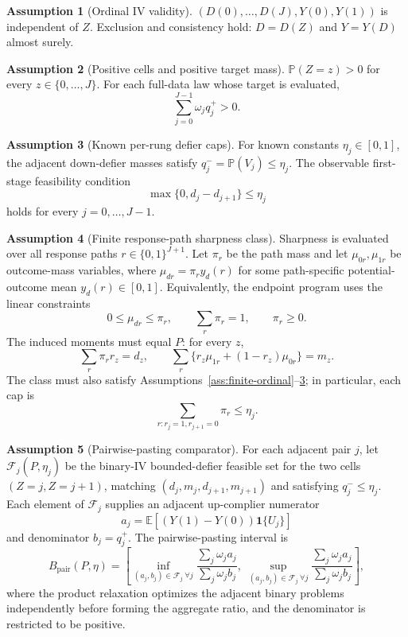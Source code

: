 \documentclass[11pt]{article}
\newcommand{\E}{\mathbb{E}}
\renewcommand{\Pr}{\mathbb{P}}
\newcommand{\one}{\mathbf{1}}
\theoremstyle{definition}
\newtheorem{assumption}{Assumption}
\theoremstyle{plain}
\theoremstyle{remark}
\begin{document}
\begin{assumption}[Ordinal IV validity]\label{ass:ord-iv}
\((D(0),\ldots,D(J),Y(0),Y(1))\) is independent of \(Z\).  Exclusion and
consistency hold: \(D=D(Z)\) and \(Y=Y(D)\) almost surely.
\end{assumption}

\begin{assumption}[Positive cells and positive target mass]\label{ass:positive}
\(\Pr(Z=z)>0\) for every \(z\in\{0,\ldots,J\}\).  For each full-data law whose
target is evaluated,
\[
\sum_{j=0}^{J-1}\omega_j q_j^+>0.
\]
\end{assumption}

\begin{assumption}[Known per-rung defier caps]\label{ass:defier-caps}
For known constants \(\eta_j\in[0,1]\), the adjacent down-defier masses satisfy
\(q_j^-=\Pr(V_j)\le\eta_j\).  The observable first-stage feasibility condition
\[
\max\{0,d_j-d_{j+1}\}\le\eta_j
\]
holds for every \(j=0,\ldots,J-1\).
\end{assumption}

\begin{assumption}[Finite response-path sharpness class]\label{ass:finite-types}
Sharpness is evaluated over all response paths \(r\in\{0,1\}^{J+1}\).  Let
\(\pi_r\) be the path mass and let \(\mu_{0r},\mu_{1r}\) be outcome-mass
variables, where \(\mu_{dr}=\pi_r y_d(r)\) for some path-specific
potential-outcome mean \(y_d(r)\in[0,1]\).  Equivalently, the endpoint program
uses the linear constraints
\[
0\le\mu_{dr}\le\pi_r,\qquad
\sum_r\pi_r=1,\qquad
\pi_r\ge0.
\]
The induced moments must equal \(P\): for every \(z\),
\[
\sum_r \pi_r r_z=d_z,\qquad
\sum_r \{r_z\mu_{1r}+(1-r_z)\mu_{0r}\}=m_z.
\]
The class must also satisfy Assumptions~\ref{ass:finite-ordinal}--\ref{ass:defier-caps};
in particular, each cap is
\[
\sum_{r:r_j=1,r_{j+1}=0}\pi_r\le\eta_j.
\]
\end{assumption}

\begin{assumption}[Pairwise-pasting comparator]\label{ass:pairwise}
For each adjacent pair \(j\), let \(\mathcal F_j(P,\eta_j)\) be the binary-IV
bounded-defier feasible set for the two cells \((Z=j,Z=j+1)\), matching
\((d_j,m_j,d_{j+1},m_{j+1})\) and satisfying \(q_j^-\le\eta_j\).  Each element
of \(\mathcal F_j\) supplies an adjacent up-complier numerator
\[
a_j=\E[(Y(1)-Y(0))\one\{U_j\}]
\]
and denominator \(b_j=q_j^+\).  The pairwise-pasting interval is
\[
B_{\mathrm{pair}}(P,\eta)=
\left[
\inf_{(a_j,b_j)\in\mathcal F_j\ \forall j}
\frac{\sum_j\omega_j a_j}{\sum_j\omega_j b_j},
\;
\sup_{(a_j,b_j)\in\mathcal F_j\ \forall j}
\frac{\sum_j\omega_j a_j}{\sum_j\omega_j b_j}
\right],
\]
where the product relaxation optimizes the adjacent binary problems
independently before forming the aggregate ratio, and the denominator is
restricted to be positive.
\end{assumption}
\end{document}
